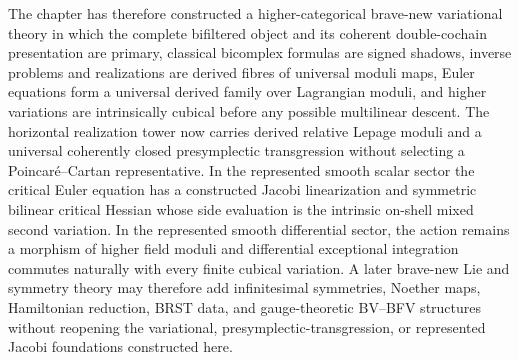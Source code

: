 The chapter has therefore constructed a higher-categorical brave-new variational theory in which the complete bifiltered object and its coherent double-cochain presentation are primary, classical bicomplex formulas are signed shadows, inverse problems and realizations are derived fibres of universal moduli maps, Euler equations form a universal derived family over Lagrangian moduli, and higher variations are intrinsically cubical before any possible multilinear descent.  The horizontal realization tower now carries derived relative Lepage moduli and a universal coherently closed presymplectic transgression without selecting a Poincar\'e--Cartan representative.  In the represented smooth scalar sector the critical Euler equation has a constructed Jacobi linearization and symmetric bilinear critical Hessian whose side evaluation is the intrinsic on-shell mixed second variation.  In the represented smooth differential sector, the action remains a morphism of higher field moduli and differential exceptional integration commutes naturally with every finite cubical variation.  A later brave-new Lie and symmetry theory may therefore add infinitesimal symmetries, Noether maps, Hamiltonian reduction, BRST data, and gauge-theoretic BV--BFV structures without reopening the variational, presymplectic-transgression, or represented Jacobi foundations constructed here.
